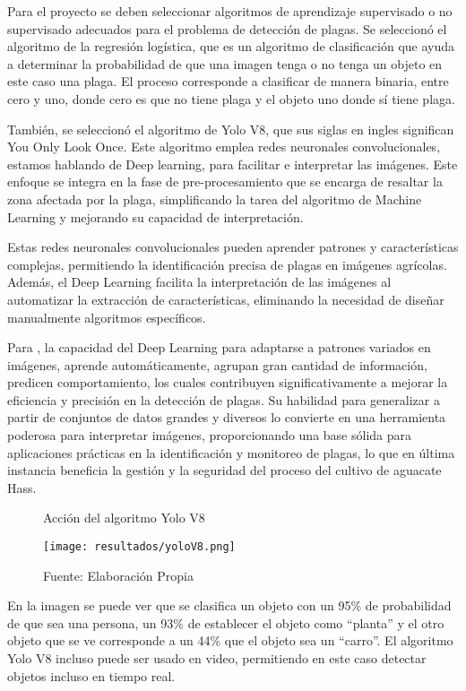 Para el proyecto se deben seleccionar algoritmos de aprendizaje supervisado o no supervisado adecuados para el problema de detección de plagas. Se seleccionó el algoritmo de la regresión logística, que es un algoritmo de clasificación que ayuda a determinar la probabilidad de que una imagen tenga o no tenga un objeto en este caso una plaga. El proceso corresponde a clasificar de manera binaria, entre cero y uno, donde cero es que no tiene plaga y el objeto uno donde sí tiene plaga.

También, se seleccionó el algoritmo de Yolo V8, que sus siglas en ingles significan You Only Look Once. Este algoritmo emplea redes neuronales convolucionales, estamos hablando de Deep learning, para facilitar e interpretar las imágenes. Este enfoque se integra en la fase de pre-procesamiento que se encarga de resaltar la zona afectada por la plaga, simplificando la tarea del algoritmo de Machine Learning y mejorando su capacidad de interpretación.

Estas redes neuronales convolucionales pueden aprender patrones y características complejas, permitiendo la identificación precisa de plagas en imágenes agrícolas. Además, el Deep Learning facilita la interpretación de las imágenes al automatizar la extracción de características, eliminando la necesidad de diseñar manualmente algoritmos específicos.

\newpage

Para \cite{schmidhuber2015deep}, la capacidad del Deep Learning para adaptarse a patrones variados en imágenes, aprende automáticamente, agrupan gran cantidad de información, predicen comportamiento, los cuales contribuyen significativamente a mejorar la eficiencia y precisión en la detección de plagas. Su habilidad para generalizar a partir de conjuntos de datos grandes y diversos lo convierte en una herramienta poderosa para interpretar imágenes, proporcionando una base sólida para aplicaciones prácticas en la identificación y monitoreo de plagas, lo que en última instancia beneficia la gestión y la seguridad del proceso del cultivo de aguacate Hass.

\begin{figure}[h]
\centering
\caption{Acción del algoritmo Yolo V8}
\texttt{[image: resultados/yoloV8.png]}
\caption*{\footnotesize Fuente: Elaboración Propia}
\label{fig:figuraYoloV8}
\end{figure}

\newpage

En la imagen se puede ver que se clasifica un objeto con un 95\% de probabilidad de que sea una persona, un 93\% de establecer el objeto como “planta” y el otro objeto que se ve corresponde a un 44\% que el objeto sea un “carro”. El algoritmo Yolo V8 incluso puede ser usado en video, permitiendo en este caso detectar objetos incluso en tiempo real.

